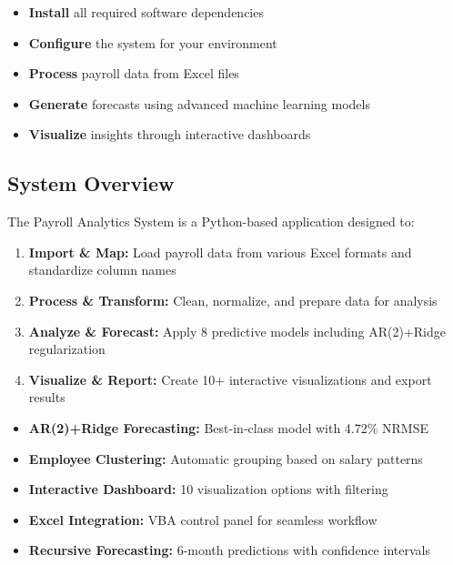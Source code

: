 \documentclass[11pt,a4paper]{article}
\begin{document}
\begin{itemize}[leftmargin=*]
    \item \textbf{Install} all required software dependencies
    \item \textbf{Configure} the system for your environment
    \item \textbf{Process} payroll data from Excel files
    \item \textbf{Generate} forecasts using advanced machine learning models
    \item \textbf{Visualize} insights through interactive dashboards
\end{itemize}

\subsection{System Overview}

The Payroll Analytics System is a Python-based application designed to:

\begin{enumerate}[leftmargin=*]
    \item \textbf{Import \& Map:} Load payroll data from various Excel formats and standardize column names
    \item \textbf{Process \& Transform:} Clean, normalize, and prepare data for analysis
    \item \textbf{Analyze \& Forecast:} Apply 8 predictive models including AR(2)+Ridge regularization
    \item \textbf{Visualize \& Report:} Create 10+ interactive visualizations and export results
\end{enumerate}

\begin{infobox}[title=\faLightbulb\ Key Features]
\begin{itemize}[leftmargin=*]
    \item \textbf{AR(2)+Ridge Forecasting:} Best-in-class model with 4.72\% NRMSE
    \item \textbf{Employee Clustering:} Automatic grouping based on salary patterns
    \item \textbf{Interactive Dashboard:} 10 visualization options with filtering
    \item \textbf{Excel Integration:} VBA control panel for seamless workflow
    \item \textbf{Recursive Forecasting:} 6-month predictions with confidence intervals
\end{itemize}
\end{infobox}
\end{document}
